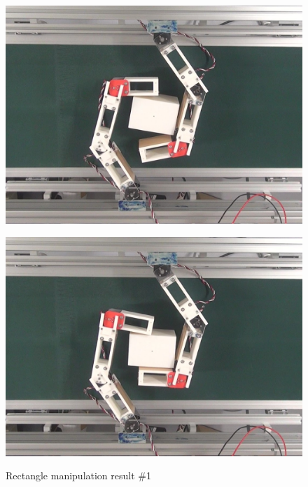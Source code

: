 \documentclass[a4paper,twoside,12pt,papersize, dvipdfmx]{iirthesis}
\begin{document}
\begin{figure}[b]
\begin{minipage}{0.249\hsize}
\includegraphics[width=0.98\hsize]{fig/4-manipulation-result/Rectangle/1-3.jpg}
\subcaption{}\label{}
\end{minipage}\hfill
\begin{minipage}{0.249\hsize}
\centering
\includegraphics[width=0.98\hsize]{fig/4-manipulation-result/Rectangle/1-4.jpg}
\subcaption{}\label{}
\end{minipage}
\caption{Rectangle manipulation result \#1}\label{fig::result::rm1}


\end{figure}
\end{document}

